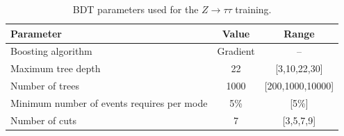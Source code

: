 \begin{table}[htbp!]
\centering
\begin{tabular}{|l|c|c|}
\hline
Parameter                                    & Value    & Range     \\
\hline
Boosting algorithm                           & Gradient & --        \\
Maximum tree depth                           &  22      & [3,10,22,30]    \\
Number of trees                              &  1000    & [200,1000,10000] \\
Minimum number of events requires per mode   &  5\%     & [5\%]\\
Number of cuts                               &  7       & [3,5,7,9]  \\
\hline
\end{tabular}
\caption{BDT parameters used for the $Z\rightarrow\tau\tau$ training.} 
\label{tab:ZBDTparameters}
\end{table}

